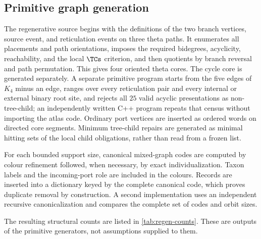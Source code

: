 \subsection{Primitive graph generation}

The regenerative source begins with the definitions of the two branch vertices, source event, and reticulation events on three theta paths.  It enumerates all placements and path orientations, imposes the required bidegrees, acyclicity, reachability, and the local $\TCs$ criterion, and then quotients by branch reversal and path permutation.  This gives four oriented theta cores.  The cycle core is generated separately.  A separate primitive program starts from the five edges of $K_4$ minus an edge, ranges over every reticulation pair and every internal or external binary root site, and rejects all $25$ valid acyclic presentations as non-tree-child; an independently written C++ program repeats that census without importing the atlas code.  Ordinary port vertices are inserted as ordered words on directed core segments.  Minimum tree-child repairs are generated as minimal hitting sets of the local child obligations, rather than read from a frozen list.

For each bounded support size, canonical mixed-graph codes are computed by colour refinement followed, when necessary, by exact individualization.  Taxon labels and the incoming-port role are included in the colours.  Records are inserted into a dictionary keyed by the complete canonical code, which proves duplicate removal by construction.  A second implementation uses an independent recursive canonicalization and compares the complete set of codes and orbit sizes.

The resulting structural counts are listed in \cref{tab:regen-counts}.  These are outputs of the primitive generators, not assumptions supplied to them.

